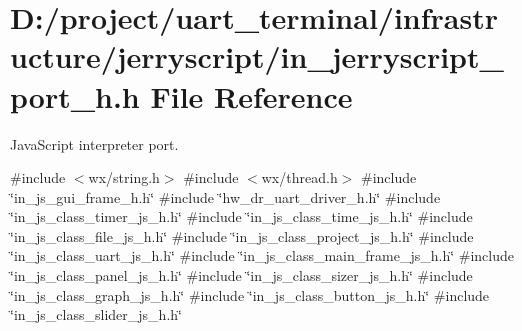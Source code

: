 \section{D\+:/project/uart\+\_\+terminal/infrastructure/jerryscript/in\+\_\+jerryscript\+\_\+port\+\_\+h.h File Reference}
\label{in__jerryscript__port__h_8h}


Java\+Script interpreter port.  


{\ttfamily \#include $<$wx/string.\+h$>$}\newline
{\ttfamily \#include $<$wx/thread.\+h$>$}\newline
{\ttfamily \#include \char`\"{}in\+\_\+js\+\_\+gui\+\_\+frame\+\_\+h.\+h\char`\"{}}\newline
{\ttfamily \#include \char`\"{}hw\+\_\+dr\+\_\+uart\+\_\+driver\+\_\+h.\+h\char`\"{}}\newline
{\ttfamily \#include \char`\"{}in\+\_\+js\+\_\+class\+\_\+timer\+\_\+js\+\_\+h.\+h\char`\"{}}\newline
{\ttfamily \#include \char`\"{}in\+\_\+js\+\_\+class\+\_\+time\+\_\+js\+\_\+h.\+h\char`\"{}}\newline
{\ttfamily \#include \char`\"{}in\+\_\+js\+\_\+class\+\_\+file\+\_\+js\+\_\+h.\+h\char`\"{}}\newline
{\ttfamily \#include \char`\"{}in\+\_\+js\+\_\+class\+\_\+project\+\_\+js\+\_\+h.\+h\char`\"{}}\newline
{\ttfamily \#include \char`\"{}in\+\_\+js\+\_\+class\+\_\+uart\+\_\+js\+\_\+h.\+h\char`\"{}}\newline
{\ttfamily \#include \char`\"{}in\+\_\+js\+\_\+class\+\_\+main\+\_\+frame\+\_\+js\+\_\+h.\+h\char`\"{}}\newline
{\ttfamily \#include \char`\"{}in\+\_\+js\+\_\+class\+\_\+panel\+\_\+js\+\_\+h.\+h\char`\"{}}\newline
{\ttfamily \#include \char`\"{}in\+\_\+js\+\_\+class\+\_\+sizer\+\_\+js\+\_\+h.\+h\char`\"{}}\newline
{\ttfamily \#include \char`\"{}in\+\_\+js\+\_\+class\+\_\+graph\+\_\+js\+\_\+h.\+h\char`\"{}}\newline
{\ttfamily \#include \char`\"{}in\+\_\+js\+\_\+class\+\_\+button\+\_\+js\+\_\+h.\+h\char`\"{}}\newline
{\ttfamily \#include \char`\"{}in\+\_\+js\+\_\+class\+\_\+slider\+\_\+js\+\_\+h.\+h\char`\"{}}\newline

